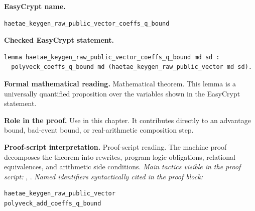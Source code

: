 \begin{formaltheorem}
\noindent\textbf{EasyCrypt name.}
\begin{lstlisting}[language=EasyCrypt,basicstyle=\ttfamily\scriptsize]
haetae_keygen_raw_public_vector_coeffs_q_bound
\end{lstlisting}
\noindent\textbf{Checked EasyCrypt statement.}
\begin{lstlisting}[language=EasyCrypt,basicstyle=\ttfamily\scriptsize]
lemma haetae_keygen_raw_public_vector_coeffs_q_bound md sd :
  polyveck_coeffs_q_bound md (haetae_keygen_raw_public_vector md sd).
\end{lstlisting}
\noindent\textbf{Formal mathematical reading.}
Mathematical theorem. This lemma is a universally quantified proposition over the variables shown in the EasyCrypt statement.

\noindent\textbf{Role in the proof.}
Use in this chapter. It contributes directly to an advantage bound, bad-event bound, or real-arithmetic composition step.

\noindent\textbf{Proof-script interpretation.}
Proof-script reading. The machine proof decomposes the theorem into rewrites, program-logic obligations, relational equivalences, and arithmetic side conditions.
\emph{Main tactics visible in the proof script:} , .
\emph{Named identifiers syntactically cited in the proof block:}
\begin{lstlisting}[language=EasyCrypt,basicstyle=\ttfamily\scriptsize]
haetae_keygen_raw_public_vector
polyveck_add_coeffs_q_bound
\end{lstlisting}

\end{formaltheorem}

